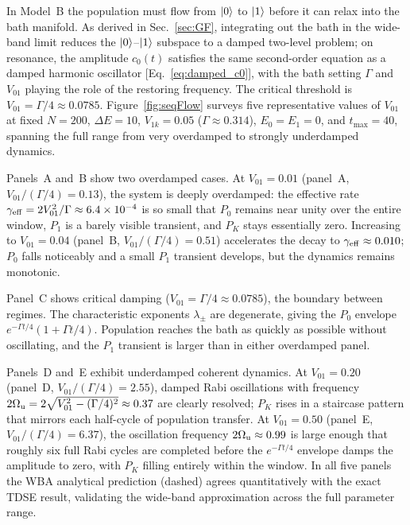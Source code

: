 \documentclass[aps,prx,reprint,showpacs,showkeys,floatfix]{revtex4-2}
\begin{document}
In Model~B the population must flow from $\ket{0}$ to $\ket{1}$ before it
can relax into the bath manifold.  As derived in Sec.~\ref{sec:GF},
integrating out the bath in the wide-band limit reduces the $\ket{0}$--$\ket{1}$
subspace to a damped two-level problem; on resonance, the amplitude
$c_0(t)$ satisfies the same second-order equation as a damped harmonic
oscillator [Eq.~\eqref{eq:damped_c0}], with the bath setting $\Gamma$
and $V_{01}$ playing the role of the restoring frequency.
The critical threshold is $V_{01}=\Gamma/4\approx0.0785$.
Figure~\ref{fig:seqFlow} surveys five representative values of $V_{01}$
at fixed $N=200$, $\Delta E=10$, $V_{1k}=0.05$ ($\Gamma\approx0.314$),
$E_0=E_1=0$, and $t_{\max}=40$, spanning the full range from very
overdamped to strongly underdamped dynamics.

Panels~A and~B show two overdamped cases.
At $V_{01}=0.01$ (panel~A, $V_{01}/(\Gamma/4)=0.13$), the system is
deeply overdamped: the effective rate $\gamma_{\rm eff}=2V_{01}^{2}/\Gamma
\approx6.4\times10^{-4}$ is so small that $P_0$ remains near unity
over the entire window, $P_1$ is a barely visible transient, and $P_K$
stays essentially zero.  Increasing to $V_{01}=0.04$ (panel~B,
$V_{01}/(\Gamma/4)=0.51$) accelerates the decay to
$\gamma_{\rm eff}\approx0.010$; $P_0$ falls noticeably and a small
$P_1$ transient develops, but the dynamics remains monotonic.

Panel~C shows critical damping ($V_{01}=\Gamma/4\approx0.0785$), the
boundary between regimes.  The characteristic exponents $\lambda_{\pm}$
are degenerate, giving the $P_0$ envelope $e^{-\Gamma t/4}(1+\Gamma t/4)$.
Population reaches the bath as quickly as possible without oscillating,
and the $P_1$ transient is larger than in either overdamped panel.

Panels~D and~E exhibit underdamped coherent dynamics.
At $V_{01}=0.20$ (panel~D, $V_{01}/(\Gamma/4)=2.55$), damped Rabi
oscillations with frequency $2\Omega_{\rm u}=
2\sqrt{V_{01}^{2}-(\Gamma/4)^{2}}\approx0.37$ are clearly resolved;
$P_K$ rises in a staircase pattern that mirrors each half-cycle of
population transfer.  At $V_{01}=0.50$ (panel~E,
$V_{01}/(\Gamma/4)=6.37$), the oscillation frequency
$2\Omega_{\rm u}\approx0.99$ is large enough that roughly six full
Rabi cycles are completed before the $e^{-\Gamma t/4}$ envelope
damps the amplitude to zero, with $P_K$ filling entirely within the
window.  In all five panels the WBA analytical prediction (dashed)
agrees quantitatively with the exact TDSE result, validating the
wide-band approximation across the full parameter range.
\end{document}
